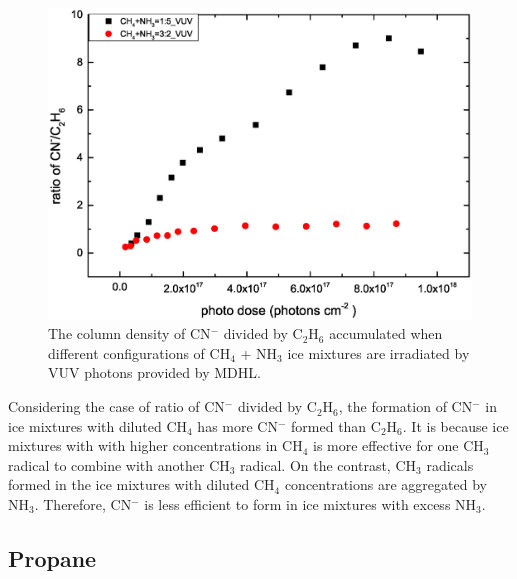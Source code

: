 \begin{figure}
\centering
\includegraphics[width=\textwidth]{figures/chapter3/CN_C2H6.eps}
\caption{The column density of CN$^-$ divided by C$_2$H$_6$ accumulated when different configurations of CH$_4$ + NH$_3$ ice mixtures are irradiated by VUV photons provided by MDHL.}
\label{fig:C2H6_CN}
\end{figure}

Considering the case of ratio of CN$^-$ divided by C$_2$H$_6$, the formation of CN$^-$ in ice mixtures with diluted CH$_4$ has more CN$^-$ formed than C$_2$H$_6$. It is because ice mixtures with with higher concentrations in CH$_4$ is more effective for one CH$_3$ radical to combine with another CH$_3$ radical. On the contrast, CH$_3$ radicals formed in the ice mixtures with diluted CH$_4$ concentrations are aggregated by NH$_3$. Therefore, CN$^-$ is less efficient to form in ice mixtures with excess NH$_3$.

\subsection{Propane}

